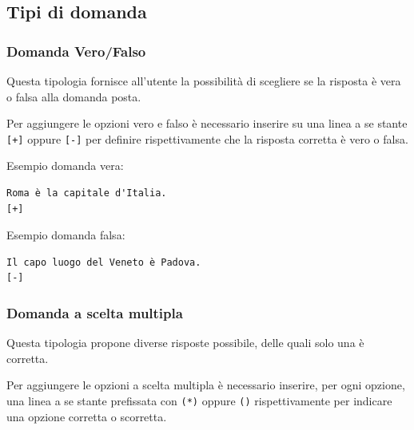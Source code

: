 \documentclass[12pt,a4paper]{article}
\begin{document}
	
	\subsection{Tipi di domanda}


	\subsubsection{Domanda Vero/Falso}

	\par Questa tipologia fornisce all'utente la possibilità di scegliere se la risposta è vera o falsa alla domanda posta. \\
	\par Per aggiungere le opzioni vero e falso è necessario inserire su una linea a se stante \texttt{[+]} oppure \texttt{[-]} per definire rispettivamente che la risposta corretta è vero o falsa. \\

	\par Esempio domanda vera: \\
\begin{verbatim}
Roma è la capitale d'Italia.
[+]
\end{verbatim}

	\par Esempio domanda falsa: \\
\begin{verbatim}
Il capo luogo del Veneto è Padova.
[-]
\end{verbatim}
	
\subsubsection{Domanda a scelta multipla}

\par Questa tipologia propone diverse risposte possibile, delle quali solo una è corretta. \\

\par Per aggiungere le opzioni a scelta multipla è necessario inserire, per ogni opzione, una linea a se stante prefissata con \texttt{(*)} oppure \texttt{()} rispettivamente per indicare una opzione corretta o scorretta. \\
\end{document}
